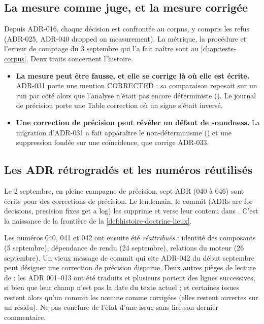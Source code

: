 \subsection{La mesure comme juge, et la mesure corrigée}

Depuis ADR-016, chaque décision est confrontée au corpus, y compris les refus (ADR-025, ADR-040 \og dropped on measurement\fg{}). La métrique, la procédure et l'erreur de comptage du 3 septembre qui l'a fait naître sont au \cref{chap:tests-corpus}. Deux traits concernent l'histoire.
\begin{itemize}
  \item \textbf{La mesure peut être fausse, et elle se corrige là où elle est écrite.} ADR-031 porte une mention \og CORRECTED\fg{} : sa comparaison reposait sur un run par côté alors que l'analyse n'était pas encore déterministe (). Le journal de précision porte une \og Table correction\fg{} où un signe s'était inversé.
  \item \textbf{Une correction de précision peut révéler un défaut de soundness.} La migration d'ADR-031 a fait apparaître le non-déterminisme () et une suppression fondée sur une coïncidence, que corrige ADR-033.
\end{itemize}

\subsection{Les ADR rétrogradés et les numéros réutilisés}

Le 2 septembre, en pleine campagne de précision, sept ADR (040 à 046) sont écrits pour des corrections de précision. Le lendemain, le commit  (\og ADRs are for decisions, precision fixes get a log\fg{}) les supprime et verse leur contenu dans . C'est la naissance de la frontière de la \cref{def:histoire-doctrine-lieux}.

\begin{piege}
Les numéros 040, 041 et 042 ont ensuite été \emph{réattribués} : identité des composants (5 septembre), dépendance de rendu (24 septembre), relations du moteur (26 septembre). Un vieux message de commit qui cite \og ADR-042\fg{} du début septembre peut désigner une correction de précision disparue. Deux autres pièges de lecture de  : les ADR 001--013 ont été traduits et plusieurs portent des lignes  successives, si bien que leur champ  n'est pas la date du texte actuel ; et certaines issues restent  alors qu'un commit les nomme comme corrigées (elles restent ouvertes sur un résidu). Ne pas conclure de l'état d'une issue sans lire son dernier commentaire.
\end{piege}

